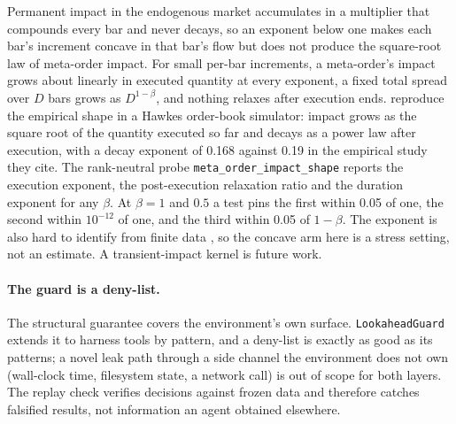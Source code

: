Permanent impact in the endogenous market accumulates in a multiplier that compounds every bar and never decays, so an exponent below one makes each bar's increment concave in that bar's flow but does not produce the square-root law of meta-order impact. For small per-bar increments, a meta-order's impact grows about linearly in executed quantity at every exponent, a fixed total spread over $D$ bars grows as $D^{1-\beta}$, and nothing relaxes after execution ends.  reproduce the empirical shape in a Hawkes order-book simulator: impact grows as the square root of the quantity executed so far and decays as a power law after execution, with a decay exponent of 0.168 against 0.19 in the empirical study they cite. The rank-neutral probe \texttt{meta\_order\_impact\_shape} reports the execution exponent, the post-execution relaxation ratio and the duration exponent for any $\beta$. At $\beta=1$ and $0.5$ a test pins the first within 0.05 of one, the second within $10^{-12}$ of one, and the third within 0.05 of $1-\beta$. The exponent is also hard to identify from finite data \citep[p.~12]{tsaknaki2026manipulation}, so the concave arm here is a stress setting, not an estimate. A transient-impact kernel is future work.

\paragraph{The guard is a deny-list.} The structural guarantee covers the environment's own surface. \texttt{LookaheadGuard} extends it to harness tools by pattern, and a deny-list is exactly as good as its patterns; a novel leak path through a side channel the environment does not own (wall-clock time, filesystem state, a network call) is out of scope for both layers. The replay check verifies decisions against frozen data and therefore catches falsified results, not information an agent obtained elsewhere.

